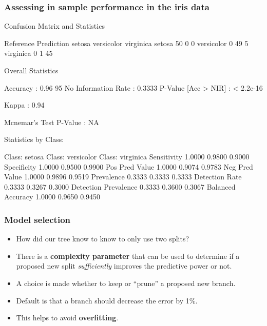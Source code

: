 \documentclass[a4paper]{article}
\begin{document}
\subsubsection{Assessing in sample performance in the iris data}
\begin{Schunk}
\begin{Soutput}
Confusion Matrix and Statistics

            Reference
Prediction   setosa versicolor virginica
  setosa         50          0         0
  versicolor      0         49         5
  virginica       0          1        45

Overall Statistics
                                         
               Accuracy : 0.96           
                 95%
    No Information Rate : 0.3333         
    P-Value [Acc > NIR] : < 2.2e-16      
                                         
                  Kappa : 0.94           
                                         
 Mcnemar's Test P-Value : NA             

Statistics by Class:

                     Class: setosa Class: versicolor Class: virginica
Sensitivity                 1.0000            0.9800           0.9000
Specificity                 1.0000            0.9500           0.9900
Pos Pred Value              1.0000            0.9074           0.9783
Neg Pred Value              1.0000            0.9896           0.9519
Prevalence                  0.3333            0.3333           0.3333
Detection Rate              0.3333            0.3267           0.3000
Detection Prevalence        0.3333            0.3600           0.3067
Balanced Accuracy           1.0000            0.9650           0.9450
\end{Soutput}
\end{Schunk}
\subsubsection{Model selection}
\begin{itemize}
	\item How did our tree know to know to only use two splits?
	\item There is a \textbf{complexity parameter} that can be used to determine if a proposed new split \textit{sufficiently} improves the predictive power or not.
	\item A choice is made whether to keep or ``prune'' a proposed new branch.
	\item Default is that a branch should decrease the error by 1\%.
	\item This helps to avoid \textbf{overfitting}.
\end{itemize}
\end{document}
